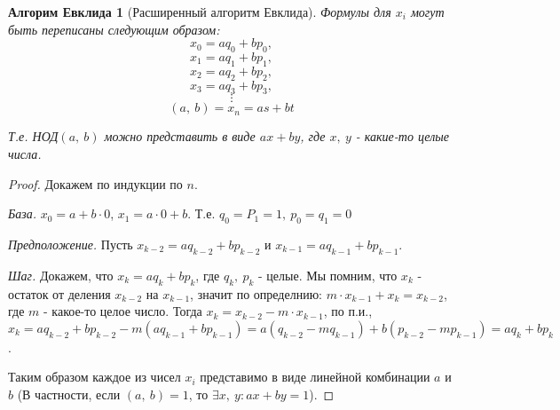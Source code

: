 \documentclass[a4paper,12pt]{article}
\newtheorem*{Evc} {Алгорим Евклида}
\begin{document}
		\begin{Evc}[Расширенный алгоритм Евклида]
			Формулы для $x_i$ могут быть переписаны следующим образом:
			$$x_0 = aq_0 + bp_0,$$
			$$x_1 = aq_1 + bp_1,$$
			$$x_2 = aq_2 + bp_2,$$
			$$x_3 = aq_3 + bp_3,$$
	 		$$\vdots$$
			$$(a,\ b) = x_n = as + bt$$

            Т.е. НОД$(a,\ b)$ можно представить в виде $ax + by$, где $x,\ y$ - какие-то целые числа.
		\end{Evc}
		\begin{proof}
			Докажем по индукции по $n$.

			\textit{База.} $x_0 = a + b \cdot 0$, $x_1 = a \cdot 0 + b$. Т.е. $q_0 = P_1 = 1,\ p_0 = q_1 = 0$

			\textit{Предположение.} Пусть $x_{k - 2} = aq_{k - 2} + bp_{k - 2}$ и $x_{k - 1} = aq_{k - 1} + bp_{k - 1}$.

			\textit{Шаг.} Докажем, что $x_k = aq_{k} + bp_{k}$, где $q_k,\ p_k$ - целые. Мы помним, что $x_k$ - остаток от деления $x_{k - 2}$ на $x_{k - 1}$, значит по определнию: $m\cdot x_{k - 1} + x_k = x_{k - 2}$, где $m$ - какое-то целое число. Тогда $x_k = x_{k - 2} - m \cdot x_{k - 1}$, по п.и., $x_k = aq_{k - 2} + bp_{k - 2} - m(aq_{k - 1} + bp_{k - 1}) = a(q_{k - 2} - mq_{k - 1}) + b(p_{k - 2} - mp_{k - 1}) = aq_{k} + bp_{k}$.

			Таким образом каждое из чисел $x_i$ представимо в виде линейной комбинации $a$ и $b$ (В частности, если $(a,\ b) = 1$, то $\exists x,\ y: ax + by = 1$).
		\end{proof}
\end{document}

